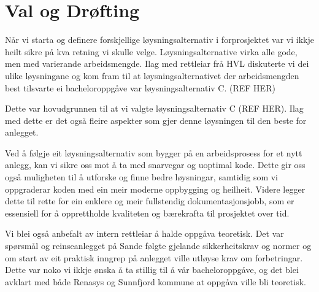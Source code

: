 \newpage
\section{Val og Drøfting}

Når vi starta og definere forskjellige løysningsalternativ i forprosjektet var vi
ikkje heilt sikre på kva retning vi skulle velge. Løysningsalternative virka alle gode,
men med varierande arbeidsmengde. Ilag med rettleiar frå HVL 
diskuterte vi dei ulike løysningane og kom fram til at løysningsalternativet der arbeidsmengden best
tilsvarte ei bacheloroppgåve var løysningsalternativ C. (REF HER)

Dette var hovudgrunnen til at vi valgte løysningsalternativ C (REF HER).
Ilag med dette er det også fleire aspekter som gjer denne løysningen til den beste for anlegget.

Ved å følgje eit løysningsalternativ som bygger på en arbeidsprosess for et nytt anlegg, 
kan vi sikre oss mot å ta med snarvegar og uoptimal kode. 
Dette gir oss også muligheten til å utforske og finne bedre løysningar, 
samtidig som vi oppgraderar koden med ein meir moderne oppbygging og heilheit.
Videre legger dette til rette for ein enklere og meir fullstendig dokumentasjonsjobb, 
som er essensiell for å opprettholde kvaliteten og bærekrafta til prosjektet over tid.

Vi blei også anbefalt av intern rettleiar å halde oppgåva teoretisk.
Det var spørsmål og reinseanlegget på Sande følgte gjelande sikkerheitskrav og normer
og om start av eit praktisk inngrep på anlegget ville utløyse krav om forbetringar.
Dette var noko vi ikkje ønska å ta stillig til å vår bacheloroppgåve, og det blei avklart
med både Renasys og Sunnfjord kommune at oppgåva ville bli teoretisk.
